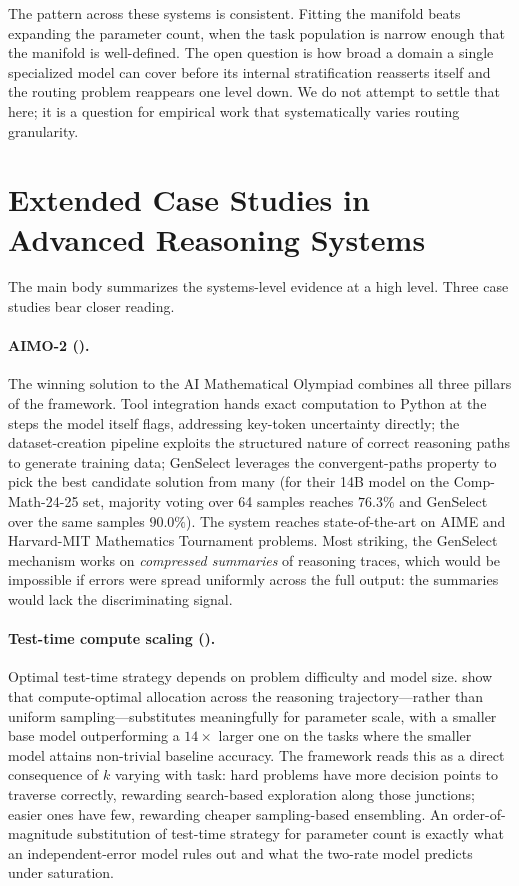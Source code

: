 The pattern across these systems is consistent. Fitting the manifold beats expanding the parameter count, when the task population is narrow enough that the manifold is well-defined. The open question is how broad a domain a single specialized model can cover before its internal stratification reasserts itself and the routing problem reappears one level down. We do not attempt to settle that here; it is a question for empirical work that systematically varies routing granularity.

\section{Extended Case Studies in Advanced Reasoning Systems}
\label{app:systems}

The main body summarizes the systems-level evidence at a high level. Three case studies bear closer reading.

\paragraph{AIMO-2 (\citet{moshkov2025aimo}).}
The winning solution to the AI Mathematical Olympiad combines all three pillars of the framework. Tool integration hands exact computation to Python at the steps the model itself flags, addressing key-token uncertainty directly; the dataset-creation pipeline exploits the structured nature of correct reasoning paths to generate training data; GenSelect leverages the convergent-paths property to pick the best candidate solution from many (for their 14B model on the Comp-Math-24-25 set, majority voting over 64 samples reaches $76.3\%$ and GenSelect over the same samples $90.0\%$). The system reaches state-of-the-art on AIME and Harvard-MIT Mathematics Tournament problems. Most striking, the GenSelect mechanism works on \emph{compressed summaries} of reasoning traces, which would be impossible if errors were spread uniformly across the full output: the summaries would lack the discriminating signal.

\paragraph{Test-time compute scaling (\citet{snell2024scaling}).}
Optimal test-time strategy depends on problem difficulty and model size. \citet{snell2024scaling} show that compute-optimal allocation across the reasoning trajectory---rather than uniform sampling---substitutes meaningfully for parameter scale, with a smaller base model outperforming a $14\times$ larger one on the tasks where the smaller model attains non-trivial baseline accuracy. The framework reads this as a direct consequence of $k$ varying with task: hard problems have more decision points to traverse correctly, rewarding search-based exploration along those junctions; easier ones have few, rewarding cheaper sampling-based ensembling. An order-of-magnitude substitution of test-time strategy for parameter count is exactly what an independent-error model rules out and what the two-rate model predicts under saturation.

